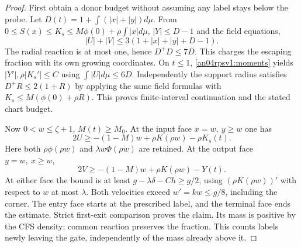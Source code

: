 \documentclass[11pt]{article}
\begin{document}
\begin{proof}
First obtain a donor budget without assuming any label stays below the
probe. Let \(D(t)=1+\int(|x|+|y|)d\mu\).
From \(0\le S(x)\le K_s\le M\phi(0)+\rho\int|x|d\mu\), \(|Y|\le D-1\)
and the field equations,
\[
 |U|+|V|\le3(1+|x|+|y|+D-1).
\]
The radial reaction is at most one, hence \(D^+D\le7D\).
This charges the escaping fraction with its own growing coordinates.
On \(t\le1\), \eqref{an04rpsv1:moments} yields
\(|Y'|,\rho|K_s'|\le C\) using \(\int|U|d\mu\le6D\).
Independently the support radius satisfies \(D^+R\le2(1+R)\)
by applying the same field formulas with \(K_s\le M(\phi(0)+\rho R)\).
This proves finite-interval continuation and the stated chart budget.

Now \(0<w\le\zeta+1\), \(M(t)\ge M_0\).
At the input face \(x=w,\ y\ge w\) one has
\[
 2U\ge -(1-M)w+\rho K(\rho w)-\rho K_s(t).
\]
Here both \(\rho\phi(\rho w)\) and \(\lambda w\Phi(\rho w)\)
are retained. At the output face \(y=w,\ x\ge w\),
\[
 2V\ge -(1-M)w+\rho K(\rho w)-Y(t).
\]
At either face the bound is at least \(g-\lambda\delta-Ch\ge g/2\),
using \((\rho K(\rho w))'\) with respect to \(w\) at most \(\lambda\).
Both velocities exceed \(w'=kw\le g/8\), including the corner.
The entry face starts at the prescribed label, and the terminal face
ends the estimate. Strict first-exit comparison proves the claim.
Its mass is positive by the CFS density; common reaction preserves
the fraction. This counts labels newly leaving the gate, independently
of the mass already above it.
\end{proof}
\end{document}
